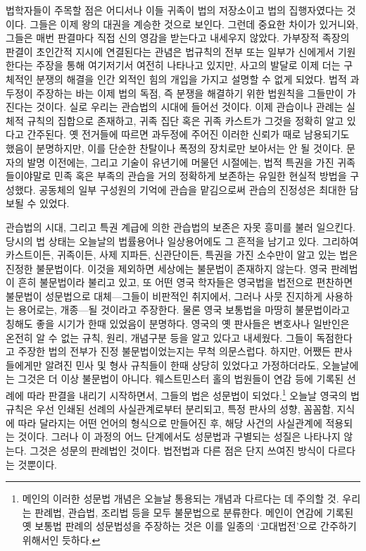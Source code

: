 법학자들이 주목할 점은
어디서나 이들 귀족이 법의 저장소이고 법의 집행자였다는 것이다.
그들은 이제 왕의 대권을 계승한 것으로 보인다.
그런데 중요한 차이가 있거니와,
그들은 매번 판결마다 직접 신의 영감을 받는다고 내세우지 않았다.
가부장적 족장의 판결이 초인간적 지시에 연결된다는 관념은
법규칙의 전부 또는 일부가 신에게서 기원한다는 주장을 통해 여기저기서 여전히
나타나고 있지만,
사고의 발달로 이제 더는 구체적인 분쟁의 해결을
인간 외적인 힘의 개입을 가지고 설명할 수 없게 되었다.
법적 과두정이 주장하는 바는 이제 법의 독점, 즉
분쟁을 해결하기 위한 법원칙을 그들만이 가진다는 것이다.
실로 우리는 관습법의 시대에 들어선 것이다.
이제 관습이나 관례는 실체적 규칙의 집합으로 존재하고,
귀족 집단 혹은 귀족 카스트가 그것을 정확히 알고 있다고 간주된다.
옛 전거들에 따르면 과두정에 주어진 이러한 신뢰가
때로 남용되기도 했음이 분명하지만,
이를 단순한 찬탈이나 폭정의 장치로만 보아서는 안 될 것이다.
문자의 발명 이전에는, 그리고 기술이 유년기에 머물던 시절에는,
법적 특권을 가진 귀족들이야말로 민족 혹은 부족의 관습을
거의 정확하게 보존하는 유일한 현실적 방법을 구성했다.
공동체의 일부 구성원의 기억에 관습을 맡김으로써
관습의 진정성은 최대한 담보될 수 있었다.

관습법의 시대, 그리고 특권 계급에 의한 관습법의 보존은
자못 흥미를 불러 일으킨다.
당시의 법 상태는 오늘날의 법률용어나 일상용어에도 그 흔적을 남기고 있다.
그리하여
카스트이든, 귀족이든, 사제 지파든, 신관단이든,
특권을 가진 소수만이 알고 있는 법은 진정한 불문법이다.
이것을 제외하면 세상에는 불문법이 존재하지 않는다.
영국 판례법이 흔히 불문법이라 불리고 있고, 또 어떤 영국 학자들은
영국법을 법전으로 편찬하면 불문법이 성문법으로
대체---그들이 비판적인 취지에서, 그러나 사뭇 진지하게 사용하는 용어로는,
개종---될 것이라고 주장한다.
물론 영국 보통법을 마땅히 불문법이라고 칭해도 좋을 시기가 한때 있었음이
분명하다.
영국의 옛 판사들은 변호사나 일반인은 온전히 알 수 없는
규칙, 원리, 개념구분 등을 알고 있다고 내세웠다.
그들이 독점한다고 주장한 법의 전부가 진정 불문법이었는지는 무척 의문스럽다.
하지만, 어쨌든 판사들에게만 알려진 민사 및 형사 규칙들이 한때 상당히 있었다고
가정하더라도, 오늘날에는 그것은 더 이상 불문법이 아니다.
웨스트민스터 홀의 법원들이
연감 등에 기록된 선례에 따라 판결을 내리기 시작하면서,
그들의 법은 성문법이 되었다.\footnote{메인의 이러한 성문법 개념은
  오늘날 통용되는 개념과 다르다는 데 주의할 것. 우리는 판례법, 관습법,
  조리법 등을 모두 불문법으로 분류한다.
  메인이 연감에 기록된 옛 보통법 판례의 성문법성을 주장하는 것은
  이를 일종의 `고대법전'으로 간주하기 위해서인 듯하다.}
오늘날 영국의 법규칙은 우선 인쇄된 선례의 사실관계로부터 분리되고,
특정 판사의 성향, 꼼꼼함, 지식에 따라 달라지는 어떤 언어의 형식으로 만들어진 후,
해당 사건의 사실관계에 적용되는 것이다.
그러나 이 과정의 어느 단계에서도 성문법과 구별되는 성질은 나타나지 않는다.
그것은 성문의 판례법인 것이다.
법전법과 다른 점은 단지 쓰여진 방식이 다르다는 것뿐이다.

